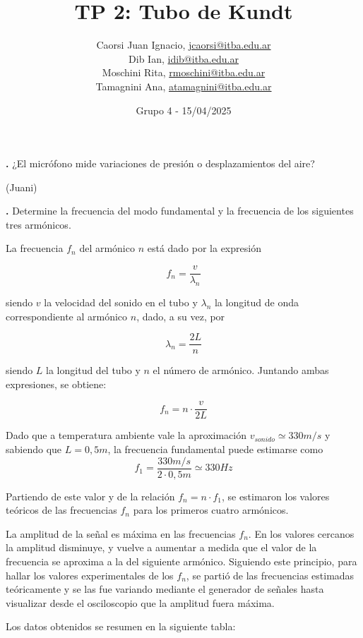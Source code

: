 \documentclass[12pt, a4paper]{article}
\title{TP 2: Tubo de Kundt}
\author
{
  Caorsi Juan Ignacio, \href{jcaorsi@itba.edu.ar}{jcaorsi@itba.edu.ar} \\
  Dib Ian, \href{idib@itba.edu.ar}{idib@itba.edu.ar} \\
  Moschini Rita, \href{rmoschini@itba.edu.ar}{rmoschini@itba.edu.ar} \\
  Tamagnini Ana, \href{atamagnini@itba.edu.ar}{atamagnini@itba.edu.ar}
}
\date{Grupo 4 - 15/04/2025}
\newcounter{step}
\newcommand{\step}[1]
{
  \par\vspace{2ex}
  \stepcounter{step}
  \noindent\textbf{\arabic{step}.} #1\par\vspace{1ex}
}
\begin{document}
\maketitle

\step{¿El micrófono mide variaciones de presión o desplazamientos del aire?}

(Juani)


\step{Determine la frecuencia del modo fundamental y la frecuencia de los siguientes tres armónicos.}

La frecuencia $f_{n}$ del armónico $n$ está dado por la expresión

\begin{equation}
    f_{n} = \frac{v}{\lambda_{n}}
  \label{equation1}
\end{equation}

siendo $v$ la velocidad del sonido en el tubo y $\lambda_{n}$ la longitud de onda correspondiente al armónico $n$, dado, a su vez, por

\begin{equation}
  \lambda_{n} = \frac{2L}{n}
  \label{equation2}
\end{equation}

siendo $L$ la longitud del tubo y $n$ el número de armónico. Juntando ambas expresiones, se obtiene:

\begin{equation}
  f_{n} = n \cdot \frac{v}{2L}
  \label{equation3}
\end{equation}

Dado que a temperatura ambiente vale la aproximación $v_{sonido}\simeq 330 m/s$ y sabiendo que $L=0,5 m$, la frecuencia fundamental puede estimarse como 
$$f_{1} = \frac{330 m/s}{2 \cdot 0,5m} \simeq 330 Hz$$

Partiendo de este valor y de la relación $f_{n}=n\cdot f_{1}$, se estimaron los valores teóricos de las frecuencias $f_{n}$ para los primeros cuatro armónicos.

La amplitud de la señal es máxima en las frecuencias $f_{n}$. En los valores cercanos la amplitud disminuye, y vuelve a aumentar a medida que el valor de la frecuencia se aproxima a la del siguiente armónico. Siguiendo este principio, para hallar los valores experimentales de los $f_{n}$, se partió de las frecuencias estimadas teóricamente y se las fue variando mediante el generador de señales hasta visualizar desde el osciloscopio que la amplitud fuera máxima.

Los datos obtenidos se resumen en la siguiente tabla:
\end{document}
